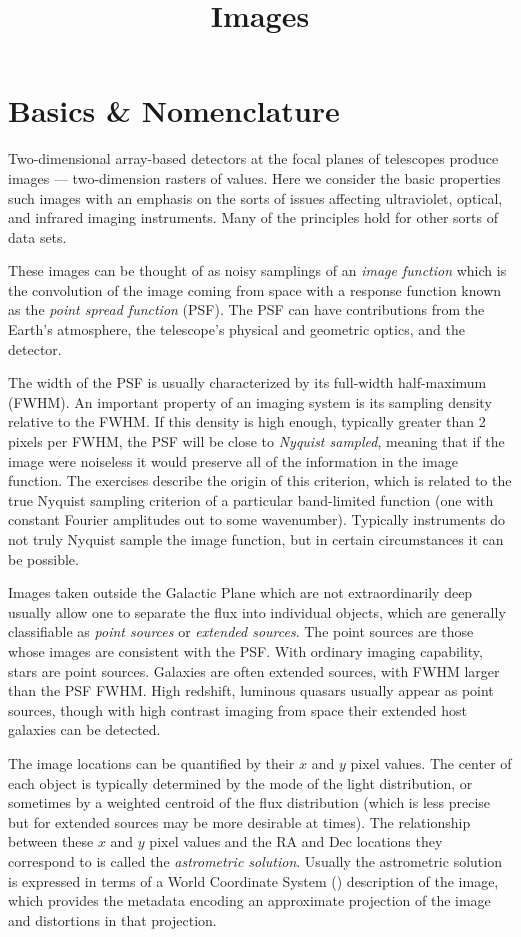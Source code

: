\title{\bf Images}

\section{Basics \& Nomenclature}

Two-dimensional array-based detectors at the focal planes of
telescopes produce images --- two-dimension rasters of values.  Here
we consider the basic properties such images with an emphasis on the
sorts of issues affecting ultraviolet, optical, and infrared imaging
instruments. Many of the principles hold for other sorts of data sets.

These images can be thought of as noisy samplings of an {\it image
function} which is the convolution of the image coming from space with
a response function known as the {\it point spread function}
(PSF). The PSF can have contributions from the Earth's atmosphere, the
telescope's physical and geometric optics, and the detector.

The width of the PSF is usually characterized by its full-width
half-maximum (FWHM). An important property of an imaging system is its
sampling density relative to the FWHM. If this density is high enough,
typically greater than 2 pixels per FWHM, the PSF will be close to
{\it Nyquist sampled}, meaning that if the image were noiseless it
would preserve all of the information in the image function. The
exercises describe the origin of this criterion, which is related to
the true Nyquist sampling criterion of a particular band-limited
function (one with constant Fourier amplitudes out to some
wavenumber). Typically instruments do not truly Nyquist sample the
image function, but in certain circumstances it can be possible.

Images taken outside the Galactic Plane which are not extraordinarily
deep usually allow one to separate the flux into individual objects,
which are generally classifiable as {\it point sources} or {\it
extended sources}. The point sources are those whose images are
consistent with the PSF. With ordinary imaging capability, stars are
point sources. Galaxies are often extended sources, with FWHM larger
than the PSF FWHM. High redshift, luminous quasars usually appear as
point sources, though with high contrast imaging from space their
extended host galaxies can be detected.

The image locations can be quantified by their $x$ and $y$ pixel
values. The center of each object is typically determined by the mode
of the light distribution, or sometimes by a weighted centroid of the
flux distribution (which is less precise but for extended sources may
be more desirable at times). The relationship between these $x$ and
$y$ pixel values and the RA and Dec locations they correspond to is
called the {\it astrometric solution}. Usually the astrometric
solution is expressed in terms of a World Coordinate System
(\citealt{wcs}) description of the image, which provides the metadata
encoding an approximate projection of the image and distortions in
that projection.

